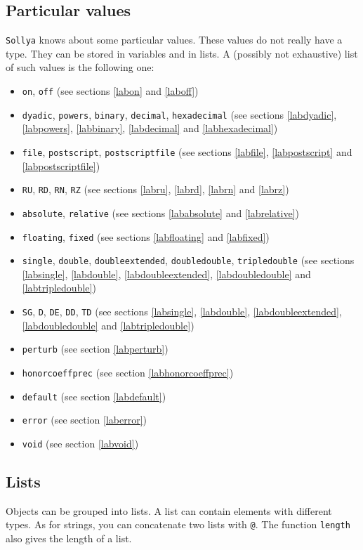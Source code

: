 \documentclass[a4paper]{article}
\newcommand{\com}[1]{\texttt{#1}}
\newcommand{\sollya}{\texttt{Sollya}\xspace}
\begin{document}
\subsection{Particular values}
\sollya knows about some particular values. These values do not really have a type. They can be stored in variables and in lists. A (possibly not exhaustive) list of such values is the following one:

\begin{itemize}
\item \com{on}, \com{off} (see sections \ref{labon} and \ref{laboff})
\item \com{dyadic}, \com{powers}, \com{binary}, \com{decimal}, \com{hexadecimal} (see sections \ref{labdyadic}, \ref{labpowers}, \ref{labbinary}, \ref{labdecimal} and \ref{labhexadecimal})
\item \com{file}, \com{postscript}, \com{postscriptfile} (see sections \ref{labfile}, \ref{labpostscript} and \ref{labpostscriptfile})
\item \com{RU}, \com{RD}, \com{RN}, \com{RZ} (see sections \ref{labru}, \ref{labrd}, \ref{labrn} and \ref{labrz})
\item \com{absolute}, \com{relative} (see sections \ref{lababsolute} and \ref{labrelative})
\item \com{floating}, \com{fixed} (see sections \ref{labfloating} and \ref{labfixed})
\item \com{single}, \com{double}, \com{doubleextended}, \com{doubledouble}, \com{tripledouble} (see sections \ref{labsingle}, \ref{labdouble}, \ref{labdoubleextended}, \ref{labdoubledouble} and \ref{labtripledouble})
\item \com{SG}, \com{D}, \com{DE}, \com{DD}, \com{TD} (see sections \ref{labsingle}, \ref{labdouble}, \ref{labdoubleextended}, \ref{labdoubledouble} and \ref{labtripledouble})
\item \com{perturb} (see section \ref{labperturb})
\item \com{honorcoeffprec} (see section \ref{labhonorcoeffprec})
\item \com{default} (see section \ref{labdefault})
\item \com{error} (see section \ref{laberror})
\item \com{void} (see section \ref{labvoid})
\end{itemize}

\subsection{Lists}
Objects can be grouped into lists. A list can contain elements with different types. As for strings, you can concatenate two lists with \com{@}. The function \com{length} also gives the length of a list.
\end{document}
